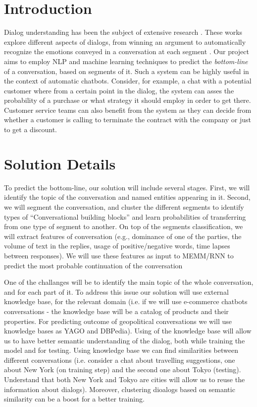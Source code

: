 \section{Introduction}
Dialog understanding has been the subject of 
extensive research \cite{BohusR03,BordesW16,GhazvininejadBC17,ShawarA03,DBLP:conf/icassp/JiB05,DBLP:conf/coling/WermterL96}. These works explore 
different aspects of dialogs, from winning an argument \cite{TanNDL16} 
to automatically recognize the emotions conveyed in a conversation at each segment \cite{AyadiKK11}. 
Our project aims to employ NLP and machine learning techniques to 
predict the {\em bottom-line} of a conversation, based on segments 
of it. Such a system can be highly useful in the context of automatic 
chatbots. Consider, for example, a chat with a potential customer where 
from a certain point in the dialog, the system can asses the probability of a purchase 
or what strategy it should employ in order to get there. 
Customer service teams can also benefit from the system as they can decide 
from whether a customer is calling to terminate the contract with the company 
or just to get a discount.

\section{Solution Details}
To predict the bottom-line, our solution will include several stages. 
First, we will identify the topic of the conversation and named entities 
appearing in it. Second, we will segment the conversation, 
and cluster the different segments to identify types of 
``Conversational building blocks'' and learn probabilities 
of transferring from one type of segment to another. 
On top of the segments classification, we will extract features of 
conversation (e.g., dominance of one of the parties, 
the volume of text in the replies, usage of positive/negative words, 
time lapses between responses). 
We will use these features as input to MEMM/RNN to predict the 
most probable continuation of the conversation 

One of the challanges will be to identify the main topic of the whole conversation, and for each
part of it. To address this issue our solution will use external knowledge base, for the relevant
domain (i.e. if we will use e-commerce chatbots conversations - the knowledge base will be a
catalog of products and their properties. For predicting outcome of geopolitical conversations we
will use knowledge bases as YAGO and DBPedia). Using of the knowledge base will allow us to
have better semantic understanding of the dialog, both while training the model and for testing. 
Using knowledge base we can find similarities between different conversations (i.e. consider a chat about travelling suggestions, one about New York (on training step) and the second one about Tokyo (testing). Understand that both New York and Tokyo are cities will allow us to reuse the information about dialogs). Moreover, clustering dioalogs based on semantic similarity can be a boost for a better training.

